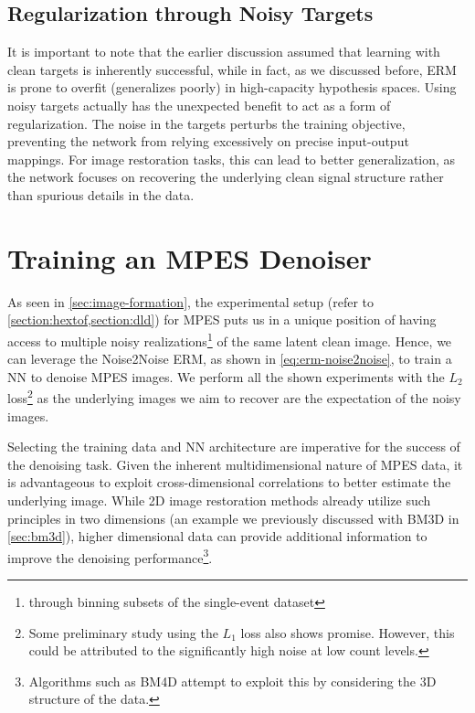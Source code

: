 \subsection{Regularization through Noisy Targets}
It is important to note that the earlier discussion assumed that learning with clean targets is inherently successful, while in fact, as we discussed before, \gls{ERM} is prone to overfit (generalizes poorly) in high-capacity hypothesis spaces. Using noisy targets actually has the unexpected benefit to act as a form of regularization. The noise in the targets perturbs the training objective, preventing the network from relying excessively on precise input-output mappings. For image restoration tasks, this can lead to better generalization, as the network focuses on recovering the underlying clean signal structure rather than spurious details in the data.

\section{Training an MPES Denoiser}
As seen in \cref{sec:image-formation}, the experimental setup (refer to \cref{section:hextof,section:dld}) for \gls{MPES} puts us in a unique position of having access to multiple noisy realizations\footnote{through binning subsets of the single-event dataset} of the same latent clean image. Hence, we can leverage the Noise2Noise \gls{ERM}, as shown in \cref{eq:erm-noise2noise}, to train a \gls{NN} to denoise \gls{MPES} images. We perform all the shown experiments with the $L_2$ loss\footnote{Some preliminary study using the $L_1$ loss also shows promise. However, this could be attributed to the significantly high noise at low count levels.} as the underlying images we aim to recover are the expectation of the noisy images.

Selecting the training data and \gls{NN} architecture are imperative for the success of the denoising task. Given the inherent multidimensional nature of \gls{MPES} data, it is advantageous to exploit cross-dimensional correlations to better estimate the underlying image. While 2D image restoration methods already utilize such principles in two dimensions (an example we previously discussed with \gls{BM3D} in \cref{sec:bm3d}), higher dimensional data can provide additional information to improve the denoising performance\footnote{Algorithms such as BM4D \cite{maggionimNonlocalTransformdomainFilter} attempt to exploit this by considering the 3D structure of the data.}. 


